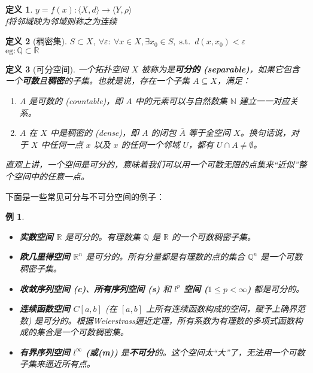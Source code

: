 \documentclass[12pt, a4paper, oneside, fontset=windows]{ctexbook}
\newtheorem{definition}{定义}[section]
\newtheorem{example}{例}[section]
\DeclareMathOperator{\st}{\mathrm{s.t.}}
\begin{document}
    \begin{definition}
        $y=f(x):\langle X,d\rangle \rightarrow \langle Y,\rho \rangle $\\
        f将邻域映为邻域则称之为连续
    \end{definition}

    \begin{definition}[稠密集]
        $S\subset X,\ \forall \varepsilon:\ \forall x \in X,\exists x_0 \in S,\st \ d(x,x_0)<\varepsilon$\\
        $\mathrm{eg:}\mathbb{Q}\subset \mathbb{R}$
    \end{definition}

    \begin{definition}[可分空间]
    一个拓扑空间 $X$ 被称为是\textbf{可分的 (separable)}，如果它包含一个\textbf{可数}且\textbf{稠密}的子集。也就是说，存在一个子集 $A \subseteq X$，满足：
    \begin{enumerate}
        \item $A$ 是可数的 (countable)，即 $A$ 中的元素可以与自然数集 $\mathbb{N}$ 建立一一对应关系。
        \item $A$ 在 $X$ 中是稠密的 (dense)，即 $A$ 的闭包 $\overline{A}$ 等于全空间 $X$。换句话说，对于 $X$ 中任何一点 $x$ 以及 $x$ 的任何一个邻域 $U$，都有 $U \cap A \neq \emptyset$。
    \end{enumerate}
    直观上讲，一个空间是可分的，意味着我们可以用一个可数无限的点集来“近似”整个空间中的任意一点。
\end{definition}

下面是一些常见可分与不可分空间的例子：
\begin{example}
    \begin{itemize}
        \item \textbf{实数空间 $\mathbb{R}$} 是可分的。有理数集 $\mathbb{Q}$ 是 $\mathbb{R}$ 的一个可数稠密子集。
        \item \textbf{欧几里得空间 $\mathbb{R}^n$} 是可分的。所有分量都是有理数的点的集合 $\mathbb{Q}^n$ 是一个可数稠密子集。
        \item \textbf{收敛序列空间 (c)}、\textbf{所有序列空间 (s)} 和 \textbf{$l^p$ 空间 ($1 \le p < \infty$)} 都是可分的。
        \item \textbf{连续函数空间 $C[a, b]$} (在 $[a, b]$ 上所有连续函数构成的空间，赋予上确界范数) 是可分的。根据Weierstrass逼近定理，所有系数为有理数的多项式函数构成的集合是一个可数稠密集。
        \item \textbf{有界序列空间 $l^{\infty}$ (或(m))} 是\textbf{不可分}的。这个空间太“大”了，无法用一个可数子集来逼近所有点。
    \end{itemize}
\end{example}
\end{document}
